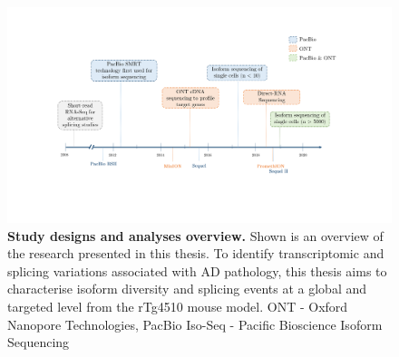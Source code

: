 \begin{landscape}
	\begin{figure}[htb]
		\begin{center}
			\includegraphics[page=2,trim={0 0 0 0},clip,scale = 0.7]{Figures/Introduction_Figures_Landscape.pdf}
		\end{center}
		\captionsetup{width=1.5\textwidth}
		\caption[Study designs and analyses overview]%
		{\textbf{Study designs and analyses overview.} Shown is an overview of the research presented in this thesis. To identify transcriptomic and splicing variations associated with AD pathology, this thesis aims to characterise isoform diversity and splicing events at a global and targeted level from the rTg4510 mouse model. ONT - Oxford Nanopore Technologies, PacBio Iso-Seq - Pacific Bioscience Isoform Sequencing}
		\label{fig:studydesign}
	\end{figure} 	
\end{landscape}